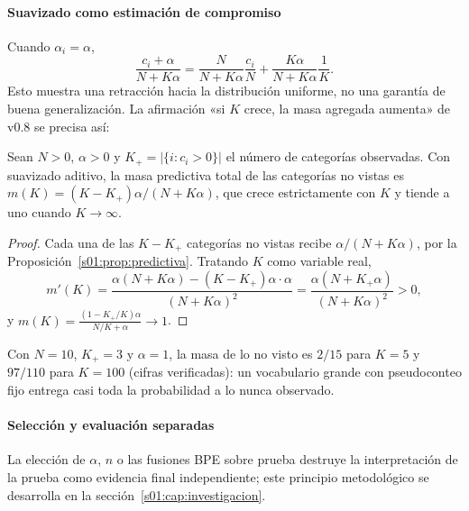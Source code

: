 \paragraph{Suavizado como estimación de compromiso}
Cuando $\alpha_i=\alpha$,
\[
\frac{c_i+\alpha}{N+K\alpha}
=\frac{N}{N+K\alpha}\frac{c_i}{N}+
\frac{K\alpha}{N+K\alpha}\frac1K.
\]
Esto muestra una retracción hacia la distribución uniforme, no una garantía
de buena generalización. La afirmación «si $K$ crece, la masa agregada aumenta»
de v0.8 se precisa así:
\begin{proposicion}\label{s01:prop:masa}
Sean $N>0$, $\alpha>0$ y $K_+=|\{i:c_i>0\}|$ el número de categorías observadas.
Con suavizado aditivo, la masa predictiva total de las categorías no vistas es
$m(K)=(K-K_+)\alpha/(N+K\alpha)$, que crece estrictamente con $K$ y tiende a uno
cuando $K\to\infty$.
\end{proposicion}
\begin{proof}
Cada una de las $K-K_+$ categorías no vistas recibe $\alpha/(N+K\alpha)$, por la
Proposición~\ref{s01:prop:predictiva}. Tratando $K$ como variable real,
\[
m'(K)=\frac{\alpha(N+K\alpha)-(K-K_+)\alpha\cdot\alpha}{(N+K\alpha)^2}
=\frac{\alpha(N+K_+\alpha)}{(N+K\alpha)^2}>0,
\]
y $m(K)=\frac{(1-K_+/K)\alpha}{N/K+\alpha}\to1$.
\end{proof}
\noindent Con $N=10$, $K_+=3$ y $\alpha=1$, la masa de lo no visto es $2/15$ para
$K=5$ y $97/110$ para $K=100$ (cifras verificadas): un vocabulario grande con
pseudoconteo fijo entrega casi toda la probabilidad a lo nunca observado.

\paragraph{Selección y evaluación separadas}
La elección de $\alpha$, $n$ o las fusiones BPE sobre prueba destruye la
interpretación de la prueba como evidencia final independiente; este principio
metodológico se desarrolla en la sección~\ref{s01:cap:investigacion}.

